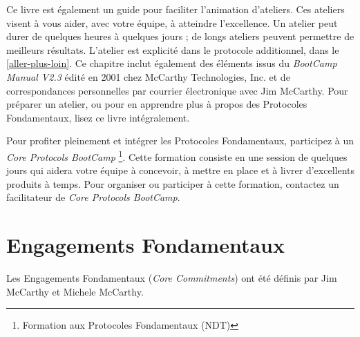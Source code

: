 \documentclass[paper=6in:9in,pagesize=pdftex,headinclude=on,footinclude=on,12pt]{scrbook}
\newcommand*{\numref}[1]{{\hyperref[{#1}]{\autoref*{#1}}}}
\begin{document}
Ce livre est également un guide pour faciliter l'animation d'ateliers. Ces ateliers visent à vous aider, avec
votre équipe, à atteindre l'excellence. Un atelier peut durer de quelques heures à quelques jours ; de longs ateliers
peuvent permettre de meilleurs résultats. L'atelier est explicité dans le protocole additionnel, 
dans le \numref{aller-plus-loin}. Ce chapitre inclut également des éléments issus du \emph{BootCamp Manual V2.3} édité en
2001 chez McCarthy Technologies, Inc. et de correspondances personnelles par courrier électronique avec Jim McCarthy. Pour
préparer un atelier, ou pour en apprendre plus à propos des Protocoles Fondamentaux, lisez ce livre intégralement.

Pour profiter pleinement et intégrer les Protocoles Fondamentaux, participez à un \emph{Core Protocols BootCamp}
\footnote{Formation aux Protocoles Fondamentaux (NDT)}. Cette formation consiste en une session de quelques jours qui aidera
votre équipe à concevoir, à mettre en place et à livrer d'excellents produits à temps. Pour organiser ou participer à cette
formation, contactez un facilitateur de \emph{Core Protocols BootCamp}.

\chapter{Engagements Fondamentaux} \label{engagements}

Les Engagements Fondamentaux (\emph{Core Commitments}) ont été définis par Jim McCarthy et Michele McCarthy.
\end{document}
